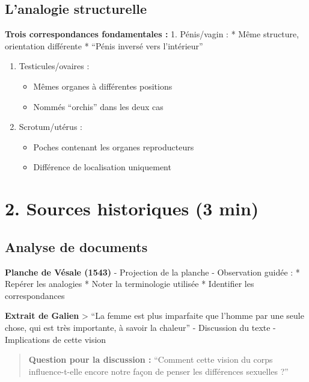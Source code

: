 \documentclass[
  letterpaper,
  DIV=11,
  numbers=noendperiod]{scrreprt}
\providecommand{\tightlist}{%
  \setlength{\itemsep}{0pt}\setlength{\parskip}{0pt}}\usepackage{longtable,booktabs,array}
\begin{document}
\subsection{L'analogie structurelle}\label{lanalogie-structurelle}

\textbf{Trois correspondances fondamentales :} 1. Pénis/vagin : * Même
structure, orientation différente * ``Pénis inversé vers l'intérieur''

\begin{enumerate}
\def\labelenumi{\arabic{enumi}.}
\setcounter{enumi}{1}
\tightlist
\item
  Testicules/ovaires :

  \begin{itemize}
  \tightlist
  \item
    Mêmes organes à différentes positions
  \item
    Nommés ``orchis'' dans les deux cas
  \end{itemize}
\item
  Scrotum/utérus :

  \begin{itemize}
  \tightlist
  \item
    Poches contenant les organes reproducteurs
  \item
    Différence de localisation uniquement
  \end{itemize}
\end{enumerate}

\section{2. Sources historiques (3
min)}\label{sources-historiques-3-min}

\subsection{Analyse de documents}\label{analyse-de-documents}

\textbf{Planche de Vésale (1543)} - Projection de la planche -
Observation guidée : * Repérer les analogies * Noter la terminologie
utilisée * Identifier les correspondances

\textbf{Extrait de Galien} \textgreater{} ``La femme est plus imparfaite
que l'homme par une seule chose, qui est très importante, à savoir la
chaleur'' - Discussion du texte - Implications de cette vision

\begin{quote}
\textbf{Question pour la discussion :} ``Comment cette vision du corps
influence-t-elle encore notre façon de penser les différences sexuelles
?''
\end{quote}
\end{document}
